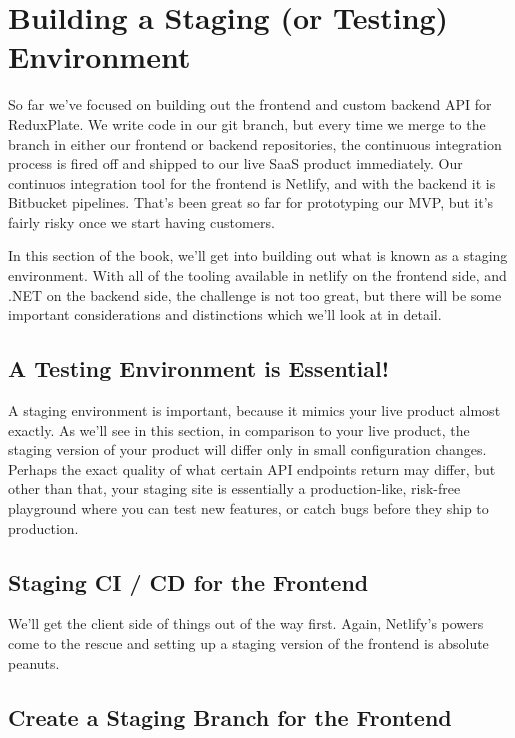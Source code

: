 \documentclass[a4paper,
                             oneside,
                             BCOR1.0cm,
                             DIV11,
                             parskip=full,
                             11pt]{scrbook}
\begin{document}
\chapter{Building a Staging (or Testing) Environment}\label{cap:primer}

So far we've focused on building out the frontend and custom backend API for ReduxPlate. We write code in our  git branch, but every time we merge to the  branch in either our frontend or backend repositories, the continuous integration process is fired off and shipped to our live SaaS product immediately. Our continuos integration tool for the frontend is Netlify, and with the backend it is Bitbucket pipelines. That's been great so far for prototyping our MVP, but it's fairly risky once we start having customers.

In this section of the book, we'll get into building out what is known as a staging environment. With all of the tooling available in netlify on the frontend side, and .NET on the backend side, the challenge is not too great, but there will be some important considerations and distinctions which we'll look at in detail.

\section{A Testing Environment is Essential!}\label{sec:titles}

A staging environment is important, because it mimics your live product almost exactly. As we'll see in this section, in comparison to your live product, the staging version of your product will differ only in small configuration changes. Perhaps the exact quality of what certain API endpoints return may differ, but other than that, your staging site is essentially a production-like, risk-free playground where you can test new features, or catch bugs before they ship to production.

\section{Staging CI / CD for the Frontend}\label{sec:titles}

We'll get the client side of things out of the way first. Again, Netlify's powers come to the rescue and setting up a staging version of the frontend is absolute peanuts. 

\section{Create a Staging Branch for the Frontend}\label{sec:titles}
\end{document}
